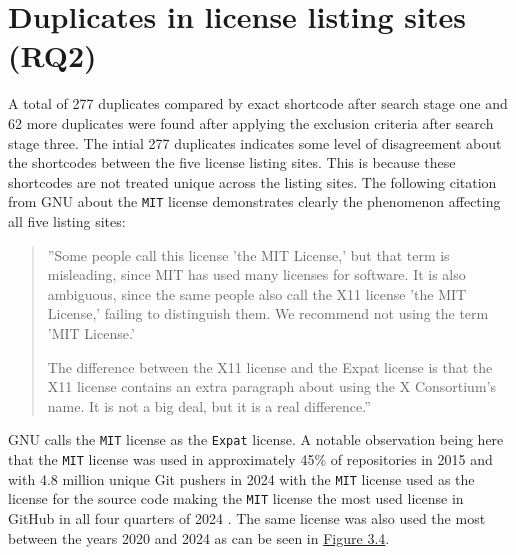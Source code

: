 \section{Duplicates in license listing sites (RQ2)}
A total of 277 duplicates compared by exact shortcode after search stage one and 62 more duplicates were found after applying the exclusion criteria after search stage three. The intial 277 duplicates indicates some level of disagreement about the shortcodes between the five license listing sites. This is because these shortcodes are not treated unique across the listing sites. The following citation from GNU \citep{gnu:licenselist} about the \texttt{MIT} license demonstrates clearly the phenomenon affecting all five listing sites:
\begin{quote}
  ''Some people call this license 'the MIT License,' but that term is misleading, since MIT has used many licenses for software. It is also ambiguous, since the same people also call the X11 license 'the MIT License,' failing to distinguish them. We recommend not using the term 'MIT License.'
  
  The difference between the X11 license and the Expat license is that the X11 license contains an extra paragraph about using the X Consortium's name. It is not a big deal, but it is a real difference.''
\end{quote}
GNU calls the \texttt{MIT} license as the \texttt{Expat} license. A notable observation being here that the \texttt{MIT} license was used in approximately 45\% of repositories in 2015 \citep{github:licenseusage} and with 4.8 million unique Git pushers in 2024 with the \texttt{MIT} license used as the license for the source code making the \texttt{MIT} license the most used license in GitHub in all four quarters of 2024 \citep{github:innovation}. The same license was also used the most between the years 2020 and 2024 as can be seen in \hyperref[fig:3-4]{Figure 3.4}.
